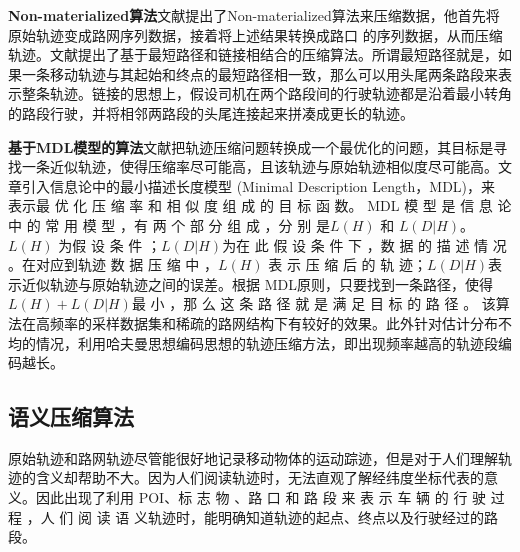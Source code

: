 \textbf{Non-materialized算法}文献\cite{YinW04}提出了Non-materialized算法来压缩数据，他首先将原始轨迹变成路网序列数据，接着将上述结果转换成路口 的序列数据，从而压缩轨迹。文献\cite{nonmaterialized}提出了基于最短路径和链接相结合的压缩算法。所谓最短路径就是，如果一条移动轨迹与其起始和终点的最短路径相一致，那么可以用头尾两条路段来表示整条轨迹。链接的思想上，假设司机在两个路段间的行驶轨迹都是沿着最小转角的路段行驶，并将相邻两路段的头尾连接起来拼凑成更长的轨迹。

\textbf{基于MDL模型的算法}文献\cite{DMDL2,MDL1}把轨迹压缩问题转换成一个最优化的问题，其目标是寻找一条近似轨迹，使得压缩率尽可能高，且该轨迹与原始轨迹相似度尽可能高。文章引入信息论中的最小描述长度模型 (Minimal Description Length，MDL)，来 表示最 优 化 压 缩 率 和 相 似 度 组 成 的 目 标 函 数。
MDL 模 型 是 信 息 论 中 的 常 用 模 型 ，有 两 个 部 分 组 成 ，分 别 是$L (H )$ 和 $L (D|H )$。$L (H )$ 为假 设 条 件 ；$L (D|H )$为在 此 假 设 条 件 下 ，数 据 的 描 述 情 况 。在对应到轨迹 数 据 压 缩 中 ，$L (H )$ 表 示 压 缩 后 的 轨 迹；$L (D|H )$表示近似轨迹与原始轨迹之间的误差。根据 MDL原则，只要找到一条路径，使得
 $L(H)+L (D|H )$最 小 ，那 么 这 条 路 径 就 是 满 足 目 标 的 路 径 。
 该算法在高频率的采样数据集和稀疏的路网结构下有较好的效果。此外针对估计分布不均的情况，\cite{hufmmanCompres}利用哈夫曼思想编码思想的轨迹压缩方法，即出现频率越高的轨迹段编码越长。
 
 \subsection{语义压缩算法}
 原始轨迹和路网轨迹尽管能很好地记录移动物体的运动踪迹，但是对于人们理解轨迹的含义却帮助不大。因为人们阅读轨迹时，无法直观了解经纬度坐标代表的意义。因此出现了利用 POI、标 志 物 、路 口 和 路 段 来 表 示 车 辆 的 行 驶 过 程 ，人 们 阅 读 语 义轨迹时，能明确知道轨迹的起点、终点以及行驶经过的路段。


